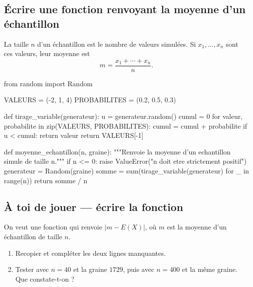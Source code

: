 \subsection{Écrire une fonction renvoyant la moyenne d'un échantillon}

La taille $n$ d'un échantillon est le nombre de valeurs simulées. Si
$x_1,\ldots,x_n$ sont ces valeurs, leur moyenne est
\[
  m=\frac{x_1+\cdots+x_n}{n}.
\]

\begin{python}
from random import Random

VALEURS = (-2, 1, 4)
PROBABILITES = (0.2, 0.5, 0.3)

def tirage_variable(generateur):
    u = generateur.random()
    cumul = 0
    for valeur, probabilite in zip(VALEURS, PROBABILITES):
        cumul = cumul + probabilite
        if u < cumul:
            return valeur
    return VALEURS[-1]

def moyenne_echantillon(n, graine):
    """Renvoie la moyenne d'un echantillon simule de taille n."""
    if n <= 0:
        raise ValueError("n doit etre strictement positif")
    generateur = Random(graine)
    somme = sum(tirage_variable(generateur) for _ in range(n))
    return somme / n
\end{python}


\subsection*{À toi de jouer — écrire la fonction}

On veut une fonction  qui renvoie
$\lvert m-E(X)\rvert$, où $m$ est la moyenne d'un échantillon de taille $n$.

\begin{enumerate}
  \item Recopier et compléter les deux lignes manquantes.
  \item Tester avec $n=40$ et la graine $1729$, puis avec $n=400$ et la même
        graine. Que constate-t-on ?
\end{enumerate}

